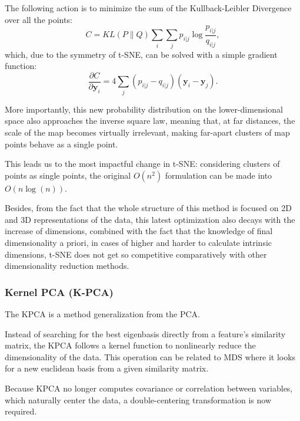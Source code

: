             The following action is to minimize the sum of the Kullback-Leibler Divergence over all the points:
            \begin{equation}
                C = KL(P\|Q) \sum_i \sum_j p_{i|j} \log\frac{p_{i|j}}{q_{i|j}},
            \end{equation}
            which, due to the symmetry of \ac{t-SNE}, can be solved with a simple gradient function:
            \begin{equation}
                \frac{\partial C}{\partial \boldsymbol{y}_i} = 4 \sum_j (p_{i|j} - q_{i|j})(\boldsymbol{y}_{i} - \boldsymbol{y}_{j}).
            \end{equation}
            
            More importantly, this new probability distribution on the lower-dimensional space also approaches the inverse square law, meaning that, at far distances, the scale of the map becomes virtually irrelevant, making far-apart clusters of map points behave as a single point. 

            This leads us to the most impactful change in \ac{t-SNE}: considering clusters of points as single points, the original $O(n^2)$ formulation can be made into $O(n \log(n))$.

            Besides, from the fact that the whole structure of this method is focused on 2D and 3D representations of the data, this latest optimization also decays with the increase of dimensions, combined with the fact that the knowledge of final dimensionality a priori, in cases of higher and harder to calculate intrinsic dimensions, \ac{t-SNE} does not get so competitive comparatively with other dimensionality reduction methods.

        \subsubsection{Kernel PCA (K-PCA)}
            The \ac{KPCA} \cite{kpca} is a method generalization from the \ac{PCA}.
            
            Instead of searching for the best eigenbasis directly from a feature's similarity matrix, the \ac{KPCA} follows a kernel function to nonlinearly reduce the dimensionality of the data. This operation can be related to \ac{MDS} where it looks for a new euclidean basis from a given similarity matrix.
            
            Because \ac{KPCA} no longer computes covariance or correlation between variables, which naturally center the data, a double-centering transformation is now required.

